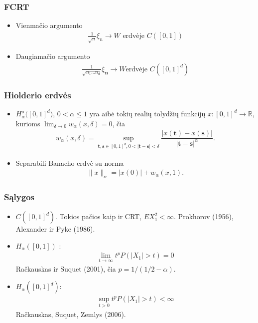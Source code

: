 \documentclass[utf8,hyperref={unicode}]{beamer}
\newcommand{\wab}[2][\delta]{w_{\alpha}(#2,#1)}
\newcommand{\normab}[1]{\lVert#1\rVert_{\alpha}}
\theoremstyle{change}\newtheorem{teorema}{Teiginys}
\theoremstyle{change}\newtheorem{salyga}{}
\begin{document}
\begin{frame}
    \frametitle{FCRT} 
	\begin{itemize}
	    \item Vienmačio argumento
		\begin{align*}
		    \frac{1}{\sqrt{n}}\xi_n\to W \text{ erdvėje } C([0,1])
		\end{align*}
	    \item Daugiamačio argumento
		\begin{align*}
		    \frac{1}{\sqrt{n_1\dots n_d}}\xi_{\bm{n}}\to W \text{
		    erdvėje } C([0,1]^d)
		\end{align*}
	\end{itemize}
\end{frame}
\begin{frame}
    \frametitle{Hiolderio erdvės} 
    \begin{itemize}
	   \item ${H}^o_\alpha\bigl([0,1]^d\bigr)$, $0<\alpha\le 1$ yra aibė tokių realių tolydžių
	funkcijų $x:[0,1]^d\to \mathbb{R}$, kurioms $\lim_{\delta\to   0}\wab{x}=0$, čia
	\begin{align*} %
	    \wab{x}=\sup_{\bm{t},\bm{s}\in[0,1]^d,0<|\bm{t}-\bm{s}|<\delta}
	    \dfrac{|x(\bm{t})-x(\bm{s})|}{|\bm{t}-\bm{s}|^\alpha}.
        \end{align*}
	\item Separabili Banacho erdvė su norma
	    \begin{align*}
	    \normab{x}=|x(0)|+\wab[1]{x}.
	    \end{align*}
       \end{itemize}

\end{frame}
\begin{frame}
    \frametitle{Sąlygos} 
    \begin{itemize}
	\item $C([0,1]^d)$. Tokios pačios kaip ir CRT, $EX_{1}^2<\infty$.
	    Prokhorov (1956), Alexander ir Pyke (1986).
	\item $H_\alpha([0,1])$ :
	    \begin{align*}
		\lim_{t\to\infty}t^pP(|X_1|>t)=0
	    \end{align*}
	    Račkauskas ir Suquet (2001), čia $p=1/(1/2-\alpha)$.
	\item $H_\alpha([0,1]^d)$:
	    \begin{align*}
		\sup_{t>0}t^pP(|X_1|>t)<\infty
	    \end{align*}
	    Račkauskas, Suquet, Zemlys (2006).

    \end{itemize}
\end{frame}
\end{document}
